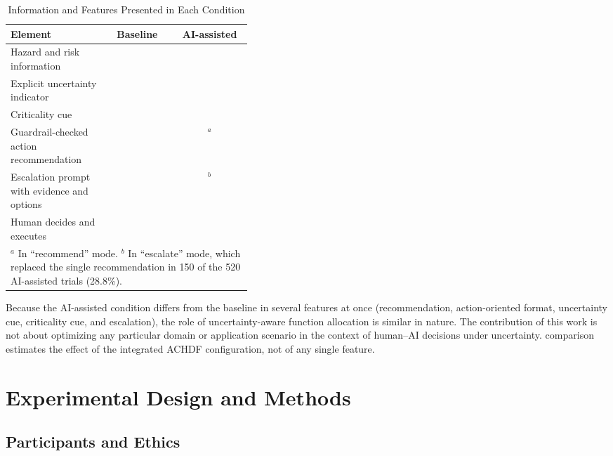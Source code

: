 \documentclass[journal]{IEEEtran}
\newcommand{\cmark}{\ding{51}}
\newcommand{\xmark}{\ding{55}}
\providecommand{\cmark}{\ding{51}}
\providecommand{\xmark}{\ding{55}}
\theoremstyle{plain}
\theoremstyle{definition}
\providecommand{\cmark}{\ding{51}}
\providecommand{\xmark}{\ding{55}}
\providecommand{\DIFaddtex}[1]{{\protect\color{blue} \sf #1}} %
\providecommand{\DIFdeltex}[1]{{\protect\color{red} \scriptsize #1}} %
\providecommand{\DIFaddbegin}{} %
\providecommand{\DIFaddend}{} %
\providecommand{\DIFdelbegin}{} %
\providecommand{\DIFdelend}{} %
\providecommand{\DIFadd}[1]{\texorpdfstring{\DIFaddtex{#1}}{#1}} %
\providecommand{\DIFdel}[1]{\texorpdfstring{\DIFdeltex{#1}}{}} %
\newcommand{\DIFscaledelfig}{0.5}
\newlength{\DIFdelgraphicswidth} %
\newlength{\DIFdelgraphicsheight} %
\newcommand{\DIFaddincludegraphics}[2][]{{\color{blue}\fbox{\DIFOincludegraphics[#1]{#2}}}} %
\newcommand{\DIFdelincludegraphics}[2][]{%
\sbox{\DIFdelgraphicsbox}{\DIFOincludegraphics[#1]{#2}}%
\settoboxwidth{\DIFdelgraphicswidth}{\DIFdelgraphicsbox} %
\settoboxtotalheight{\DIFdelgraphicsheight}{\DIFdelgraphicsbox} %
\scalebox{\DIFscaledelfig}{%
\parbox[b]{\DIFdelgraphicswidth}{\usebox{\DIFdelgraphicsbox}\\[-\baselineskip] \rule{\DIFdelgraphicswidth}{0em}}\llap{\resizebox{\DIFdelgraphicswidth}{\DIFdelgraphicsheight}{%
\setlength{\unitlength}{\DIFdelgraphicswidth}%
\begin{picture}(1,1)%
\thicklines\linethickness{2pt} %
{\color[rgb]{1,0,0}\put(0,0){\framebox(1,1){}}}%
{\color[rgb]{1,0,0}\put(0,0){\line( 1,1){1}}}%
{\color[rgb]{1,0,0}\put(0,1){\line(1,-1){1}}}%
\end{picture}%
}\hspace*{3pt}}} %
} %
\DeclareRobustCommand{\DIFaddbegin}{\DIFOaddbegin \let\includegraphics\DIFaddincludegraphics} %
\DeclareRobustCommand{\DIFaddend}{\DIFOaddend \let\includegraphics\DIFOincludegraphics} %
\DeclareRobustCommand{\DIFdelbegin}{\DIFOdelbegin \let\includegraphics\DIFdelincludegraphics} %
\DeclareRobustCommand{\DIFdelend}{\DIFOaddend \let\includegraphics\DIFOincludegraphics} %
\begin{document}
    \begin{table}[t]
        \caption{Information and Features Presented in Each Condition}
        \label{tab:conditions}
        \centering
        \begin{tabular}{p{0.40\linewidth}cc}
            \toprule
            \textbf{Element} & \textbf{Baseline} & \textbf{AI-assisted} \\
            \midrule
            Hazard and risk information & \cmark & \cmark \\
            Explicit uncertainty indicator & \xmark & \cmark \\
            Criticality cue & \xmark & \cmark \\
            Guardrail-checked action recommendation & \xmark & \cmark$^{a}$ \\
            Escalation prompt with evidence and options & \xmark & \cmark$^{b}$ \\
            Human decides and executes & \cmark & \cmark \\
            \bottomrule
            \multicolumn{3}{p{0.93\linewidth}}{\footnotesize $^{a}$ In ``recommend'' mode. $^{b}$ In ``escalate'' mode, which replaced the single recommendation in 150 of the 520 AI-assisted trials (28.8\%).}
        \end{tabular}
    \end{table}

    \DIFadd{Because the AI-assisted condition differs from the baseline in several features at once (recommendation, action-oriented format, uncertainty cue, criticality cue, and escalation), }\DIFaddend the \DIFdelbegin \DIFdel{role of uncertainty-aware function allocation is similar in nature. The contribution of this work is not about optimizing any particular domain or application scenario in the context of human--AI decisions under uncertainty.
}\DIFdelend \DIFaddbegin \DIFadd{comparison estimates the effect of the integrated ACHDF configuration, not of any single feature.
}\DIFaddend 

    \DIFdelbegin \section{\DIFdel{Experimental Design and Methods}}
\addtocounter{section}{-1}%
\DIFdelend \DIFaddbegin \subsection{\DIFadd{Participants and Ethics}}
    \label{sec:participants}
\DIFaddend 
\end{document}
